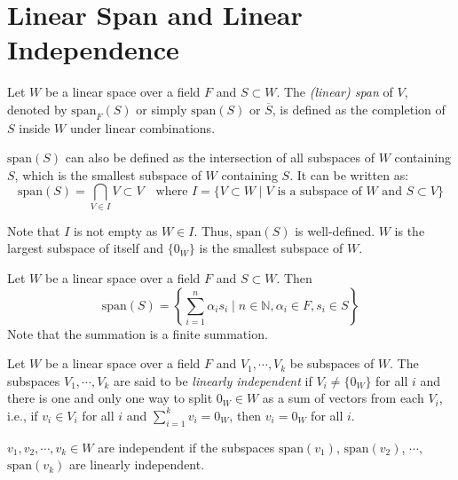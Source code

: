 \documentclass[
	11pt, %
	fleqn, %
	a4paper, %
]{LegrandOrangeBook}
\renewcommand{\span}[1]{\text{span}(#1)} %
\renewcommand{\bar}[1]{\overline{#1}} %
\begin{document}
\newpage

\section{Linear Span and Linear Independence}

\begin{definition}
    Let $W$ be a linear space over a field $F$ and $S \subset W$. The \emph{(linear) span} of $V$, denoted by $\text{span}_F (S)$ or simply $\span S$ or $\bar{S}$, is defined as the completion of $S$ inside $W$ under linear combinations.
\end{definition}

\begin{corollary}
    $\span S$ can also be defined as the intersection of all subspaces of $W$ containing $S$, which is the smallest subspace of $W$ containing $S$. It can be written as:
    \[
        \span S = \bigcap_{V \in I} V \subset V \quad \text{where } I = \{ V \subset W \mid V \text{ is a subspace of } W \text{ and } S \subset V \}
    \]
\end{corollary}

\begin{remark}
    Note that $I$ is not empty as $W \in I$. Thus, $\span S$ is well-defined. $W$ is the largest subspace of itself and $\{0_W\}$ is the smallest subspace of $W$.
\end{remark}

\begin{proposition}
    Let $W$ be a linear space over a field $F$ and $S \subset W$. Then 
    \[
        \span S = \left\{ \sum_{i=1}^{n} \alpha_i s_i \mid n \in \mathbb{N}, \alpha_i \in F, s_i \in S \right\}
    \]
    Note that the summation is a finite summation.
\end{proposition}

\begin{definition}
    Let $W$ be a linear space over a field $F$ and $V_1, \cdots, V_k$ be subspaces of $W$. The subspaces $V_1, \cdots, V_k$ are said to be \emph{linearly independent} if $V_i \neq \{0_W\}$ for all $i$ and there is one and only one way to split $0_W \in W$ as a sum of vectors from each $V_i$, i.e., if $v_i \in V_i$ for all $i$ and $\sum_{i=1}^{k} v_i = 0_W$, then $v_i = 0_W$ for all $i$.
\end{definition}

\begin{proposition}
    $v_1, v_2, \cdots, v_k \in W$ are independent if the subspaces $\span{v_1}$, $\span{v_2}$, $\cdots$, $\span{v_k}$ are linearly independent.
\end{proposition}
\end{document}

